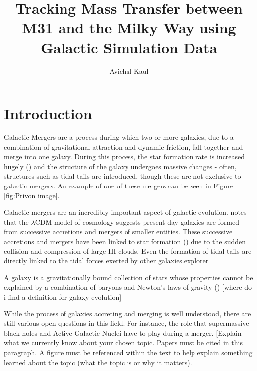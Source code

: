 \documentclass[linenumbers]{aastex631} %
\begin{document}
\title{Tracking Mass Transfer between M31 and the Milky Way using Galactic Simulation Data}




\author{Avichal Kaul}


\section{Introduction}

Galactic Mergers are a process during which two or more galaxies, due to a combination of gravitational attraction and dynamic friction, fall together and merge into one galaxy. During this process, the star formation rate is increased hugely (\citep{Moster_2011}) and the structure of the galaxy undergoes massive changes - often, structures such as tidal tails are introduced, though these are not exclusive to galactic mergers. An example of one of these mergers can be seen in Figure \ref{fig:Privon image}.


Galactic mergers are an incredibly important aspect of galactic evolution. \citep{1978MNRAS.183..341W} notes that the $\lambda\text{CDM}$ model of cosmology suggests present day galaxies are formed from successive accretions and mergers of smaller entities. These successive accretions and mergers have been linked to star formation (\citep{Barnes_2004}) due to the sudden collision and compression of large HI clouds. Even the formation of tidal tails  are directly linked to the tidal forces exerted by other galaxies.explorer

A galaxy is a gravitationally bound collection of stars whose properties
cannot be explained by a combination of baryons and Newton’s laws of gravity (\citep{Willman_Strader_2012}) [where do i find a definition for galaxy evolution]

While the process of galaxies accreting and merging is well understood, there are still various open questions in this field. For instance, the role that supermassive black holes and Active Galactic Nuclei have to play during a merger. [Explain what we currently know about your chosen topic. Papers must
be cited in this paragraph. A figure must be referenced within the text to help explain
something learned about the topic (what the topic is or why it matters).]
\end{document}
